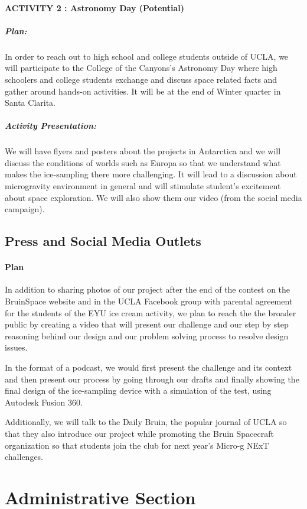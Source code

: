 \documentclass{article}
\begin{document}
\paragraph{ACTIVITY 2 : Astronomy Day (Potential)}
\subparagraph{Plan:}
In order to reach out to high school and college students outside of UCLA, we will participate to the College of the Canyons's Astronomy Day where high schoolers and college students exchange and discuss space related facts and gather around hands-on activities. It will be at the end of Winter quarter in Santa Clarita.
\subparagraph{Activity Presentation:}
We will have flyers and posters about the projects in Antarctica and we will discuss the conditions of worlds such as Europa so that we understand what makes the ice-sampling there more challenging. It will lead to a discussion about microgravity environment in general and will stimulate student's excitement about space exploration. We will also show them our video (from the social media campaign).

\subsection{Press and Social Media Outlets}
\paragraph{Plan}
In addition to sharing photos of our project after the end of the contest on the BruinSpace website and in the UCLA Facebook group with parental agreement for the students of the EYU ice cream activity, we plan to reach the the broader public by creating a video that will present our challenge and our step by step reasoning behind our design and our problem solving process to resolve design issues.\par
In the format of a podcast, we would first present the challenge and its context and then present our process by going through our drafts and finally showing the final design of the ice-sampling device with a simulation of the test, using Autodesk Fusion 360.\par
Additionally, we will talk to the Daily Bruin, the popular journal of UCLA so that they also introduce our project while promoting the Bruin Spacecraft organization so that students join the club for next year’s Micro-g NExT challenges.

\section{Administrative Section}
\end{document}
